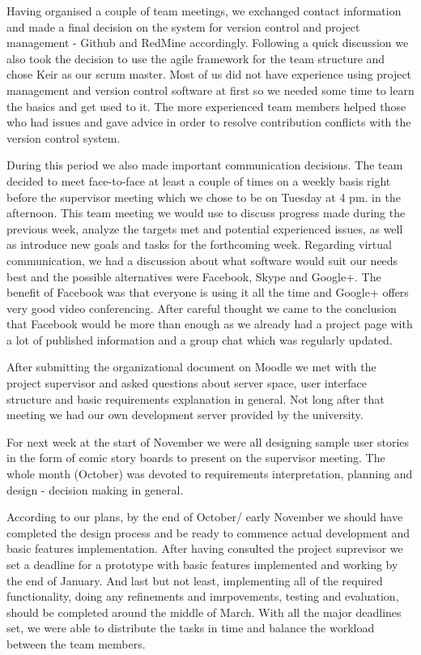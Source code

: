 \documentclass{l3proj}
\begin{document}
Having organised a couple of team meetings, we exchanged contact information and made a final decision on the system for version control and project management - Github and RedMine accordingly. Following a quick discussion we also took the decision to use the agile framework for the team structure and chose Keir as our scrum master. Most of us did not have experience using project management and version control software at first so we needed some time to learn the basics and get used to it. The more experienced team members helped those who had issues and gave advice in order to resolve contribution conflicts with the version control system.

During this period we also made important communication decisions. The team decided to meet face-to-face at least a couple of times on a weekly basis right before the supervisor meeting which we chose to be on Tuesday at 4 pm. in the afternoon. This team meeting we would use to discuss progress made during the previous week, analyze the targets met and potential experienced issues, as well as introduce new goals and tasks for the forthcoming week. Regarding virtual communication, we had a discussion about what software would suit our needs best and the possible alternatives were Facebook, Skype and Google+. The benefit of Facebook was that everyone is using it all the time and Google+ offers very good video conferencing. After careful thought we came to the conclusion that Facebook would be more than enough as we already had a project page with a lot of published information and a group chat which was regularly updated.

After submitting the organizational document on Moodle we met with the project supervisor and asked questions about server space, user interface structure and basic requirements explanation in general. Not long after that meeting we had our own development server provided by the university.

For next week at the start of November we were all designing sample user stories in the form of comic story boards to present on the supervisor meeting. The whole month (October) was devoted to requirements interpretation, planning and design - decision making in general.

According to our plans, by the end of October/ early November we should have completed the design process and be ready to commence actual development and basic features implementation. After having consulted the project suprevisor we set a deadline for a prototype with basic features implemented and working by the end of January. And last but not least, implementing all of the required functionality, doing any refinements and imrpovements, testing and evaluation, should be completed around the middle of March. With all the major deadlines set, we were able to distribute the tasks in time and balance the workload between the team members.
\end{document}
